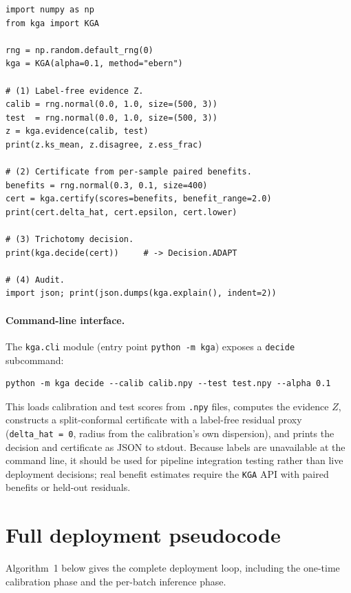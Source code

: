 \begin{verbatim}
import numpy as np
from kga import KGA

rng = np.random.default_rng(0)
kga = KGA(alpha=0.1, method="ebern")

# (1) Label-free evidence Z.
calib = rng.normal(0.0, 1.0, size=(500, 3))
test  = rng.normal(0.0, 1.0, size=(500, 3))
z = kga.evidence(calib, test)
print(z.ks_mean, z.disagree, z.ess_frac)

# (2) Certificate from per-sample paired benefits.
benefits = rng.normal(0.3, 0.1, size=400)
cert = kga.certify(scores=benefits, benefit_range=2.0)
print(cert.delta_hat, cert.epsilon, cert.lower)

# (3) Trichotomy decision.
print(kga.decide(cert))     # -> Decision.ADAPT

# (4) Audit.
import json; print(json.dumps(kga.explain(), indent=2))
\end{verbatim}

\paragraph{Command-line interface.}
The \texttt{kga.cli} module (entry point \texttt{python -m kga}) exposes a
\texttt{decide} subcommand:

\begin{verbatim}
python -m kga decide --calib calib.npy --test test.npy --alpha 0.1
\end{verbatim}

This loads calibration and test scores from \texttt{.npy} files, computes the
evidence $Z$, constructs a split-conformal certificate with a label-free
residual proxy (\texttt{delta\_hat = 0}, radius from the calibration's own
dispersion), and prints the decision and certificate as JSON to stdout.  Because
labels are unavailable at the command line, it should be used for pipeline
integration testing rather than live deployment decisions; real benefit estimates
require the \texttt{KGA} API with paired benefits or held-out residuals.

\section{Full deployment pseudocode}
\label{sec:kga-pseudocode}

Algorithm~1 below gives the complete deployment loop, including the one-time
calibration phase and the per-batch inference phase.

